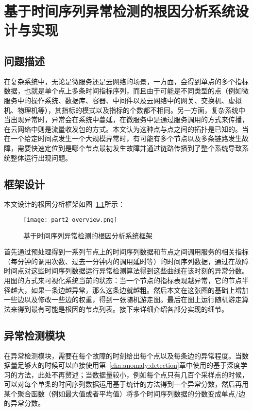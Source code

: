 
\chapter{基于时间序列异常检测的根因分析系统设计与实现}
\label{cha:root:cause:analysis}
\section{问题描述}
在复杂系统中，无论是微服务还是云网络的场景，一方面，会得到单点的多个指标数据，也就是单个点上多条时间指标序列，而且由于可能是不同类型的点（例如微服务中的操作系统、数据库、容器、中间件以及云网络中的网关、交换机、虚拟机、物理机等），其指标的模式以及指标的个数都不相同。另一方面，复杂系统中当出现异常时，异常会在系统中蔓延，在微服务中是通过服务调用的方式来传播，在云网络中则是流量收发包的方式。本文认为这种点与点之间的拓扑是已知的。当在一个给定时间点发生一个大规模异常时，有可能有多个节点以及多条链路发生故障，需要快速定位到是哪个节点最初发生故障并通过链路传播到了整个系统导致系统整体运行出现问题。

\section{框架设计}
本文设计的根因分析框架如图~\ref{fig:part2-overview}所示：
\begin{figure}[htbp]
    \centering
    \texttt{[image: part2\_overview.png]}
    \caption{基于时间序列异常检测的根因分析系统框架}
    \label{fig:part2-overview}
  \end{figure}

首先通过预处理得到一系列节点上的时间序列数据和节点之间调用服务的相关指标（每分钟的调用次数、过去一分钟内的调用延时等）的时间序列数据，通过在故障时间点对这些时间序列数据运行异常检测算法得到这些曲线在该时刻的异常分数。用图的方式来可视化系统当前的状态：当一个节点的指标表现越异常，它的节点半径越大，如果一条边越异常，那么这条边就越粗。然后本文在这张图的基础上增加一些边以及修改一些边的权重，得到一张随机游走图。最后在图上运行随机游走算法来得到最有可能是根因的节点列表。接下来详细介绍各部分实现的细节。
\section{异常检测模块}
\label{sec:anomaly:detection}
在异常检测模块，需要在每个故障的时刻给出每个点以及每条边的异常程度。当数据量足够大的时候可以直接使用第~\ref{cha:anomaly:detection}章中使用的基于深度学习的方法，此处不再赘述；当数据量较小，例如每个点只有几百个采样点的时候，可以对每个单条的时间序列数据运用基于统计的方法得到一个异常分数，然后再用某个聚合函数（例如最大值或者平均值）将多个时间序列数据的分数变成单点/边的异常分数。

